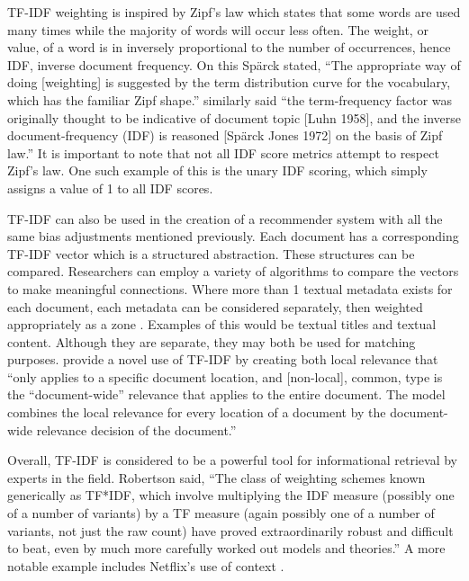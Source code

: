 TF-IDF weighting is inspired by Zipf's law which states that some words are used many times while the majority of words will occur less often. The weight, or value, of a word is in inversely proportional to the number of occurrences, hence IDF, inverse document frequency. On this Sp\"{a}rck stated, ``The appropriate way of doing [weighting] is suggested by the term distribution curve for the vocabulary, which has the familiar Zipf shape.'' \citep{Wu:2008:Interpreting_tf_idf_term_weights} similarly said ``the term-frequency factor was originally thought to be indicative of document topic [Luhn 1958], and the inverse document-frequency (IDF) is reasoned [Sp\"arck Jones 1972] on the basis of Zipf law.'' It is important to note that not all IDF score metrics attempt to respect Zipf's law. One such example of this is the unary IDF scoring, which simply assigns a value of 1 to all IDF scores.

TF-IDF can also be used in the creation of a recommender system with all the same bias adjustments mentioned previously. Each document has a corresponding TF-IDF vector which is a structured abstraction. These structures can be compared. Researchers can employ a variety of algorithms to compare the vectors to make meaningful connections. %
Where more than 1 textual metadata exists for each document, each metadata can be considered separately, then weighted appropriately as a zone \citep{manning_raghavan_2008_scoring}. Examples of this would be textual titles and textual content. Although they are separate, they may both be used for matching purposes. \citet{Wu:2008:Interpreting_tf_idf_term_weights} provide a novel use of TF-IDF by creating both local relevance that ``only applies to a specific document location, and [non-local], common, type is the ``document-wide'' relevance that applies to the entire document. The model combines the local relevance for every location of a document by the document-wide relevance decision of the document.''

Overall, TF-IDF is considered to be a powerful tool for informational retrieval by experts in the field. Robertson \citeyearpar{understanding_idf_2004} said, ``The class of weighting schemes known generically as TF*IDF, which involve multiplying the IDF measure (possibly one of a number of variants) by a TF measure (again possibly one of a number of variants, not just the raw count) have proved extraordinarily robust and difficult to beat, even by much more carefully worked out models and theories.'' A more notable example includes Netflix’s use of context \citep{Bell:2007:lessons_from_the_netflix_prize}.

